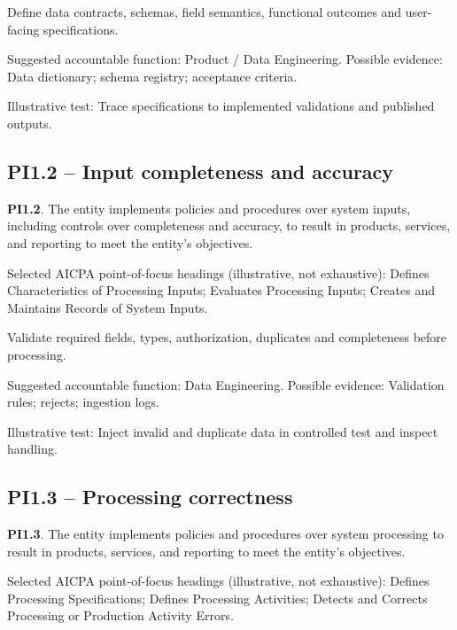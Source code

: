 \documentclass[10pt,oneside]{report}
\begin{document}
\begin{engineeringbox}
Define data contracts, schemas, field semantics, functional outcomes and user-facing specifications.
\end{engineeringbox}
Suggested accountable function: Product / Data Engineering. Possible evidence: Data dictionary; schema registry; acceptance criteria.

Illustrative test: Trace specifications to implemented validations and published outputs.

\subsection*{PI1.2 -- Input completeness and accuracy}
\begin{aicpabox}
\textbf{PI1.2}. The entity implements policies and procedures over system inputs, including controls over completeness and accuracy, to result in products, services, and reporting to meet the entity's objectives.\par{}
\end{aicpabox}
Selected AICPA point-of-focus headings (illustrative, not exhaustive): Defines Characteristics of Processing Inputs; Evaluates Processing Inputs; Creates and Maintains Records of System Inputs.

\begin{engineeringbox}
Validate required fields, types, authorization, duplicates and completeness before processing.
\end{engineeringbox}
Suggested accountable function: Data Engineering. Possible evidence: Validation rules; rejects; ingestion logs.

Illustrative test: Inject invalid and duplicate data in controlled test and inspect handling.

\subsection*{PI1.3 -- Processing correctness}
\begin{aicpabox}
\textbf{PI1.3}. The entity implements policies and procedures over system processing to result in products, services, and reporting to meet the entity's objectives.\par{}
\end{aicpabox}
Selected AICPA point-of-focus headings (illustrative, not exhaustive): Defines Processing Specifications; Defines Processing Activities; Detects and Corrects Processing or Production Activity Errors.
\end{document}
